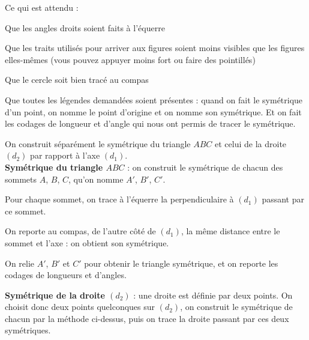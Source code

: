 \documentclass[answers]{exam}
\begin{document}
\begin{solution}
      \begin{Indication}

Ce qui est attendu : 
\begin{compactitem}
\item Que les angles droits soient faits à l'équerre
\item Que les traits utilisés pour arriver aux figures soient moins visibles que les figures elles-mêmes (vous pouvez appuyer moins fort ou faire des pointillés)
\item Que le cercle soit bien tracé au compas
\item Que toutes les légendes demandées soient présentes : quand on fait le symétrique d'un point, on nomme le point d'origine et on nomme son symétrique. Et on fait les codages de longueur et d'angle qui nous ont permis de tracer le symétrique.
\item {}
\item {}
\end{compactitem}

      \end{Indication}

      On construit séparément le symétrique du triangle $ABC$ et celui de la droite $(d_2)$ par rapport à l'axe $(d_1)$. \\

      \textbf{Symétrique du triangle $ABC$} : on construit le symétrique de chacun des sommets $A$, $B$, $C$, qu'on nomme $A'$, $B'$, $C'$.
      \begin{compactenum}
        \item Pour chaque sommet, on trace à l'équerre la perpendiculaire à $(d_1)$ passant par ce sommet.
        \item On reporte au compas, de l'autre côté de $(d_1)$, la même distance entre le sommet et l'axe : on obtient son symétrique.
        \item On relie $A'$, $B'$ et $C'$ pour obtenir le triangle symétrique, et on reporte les codages de longueurs et d'angles.
      \end{compactenum}

      \textbf{Symétrique de la droite $(d_2)$} : une droite est définie par deux points. On choisit donc deux points quelconques sur $(d_2)$, on construit le symétrique de chacun par la méthode ci-dessus, puis on trace la droite passant par ces deux symétriques.

\end{solution}
\end{document}
